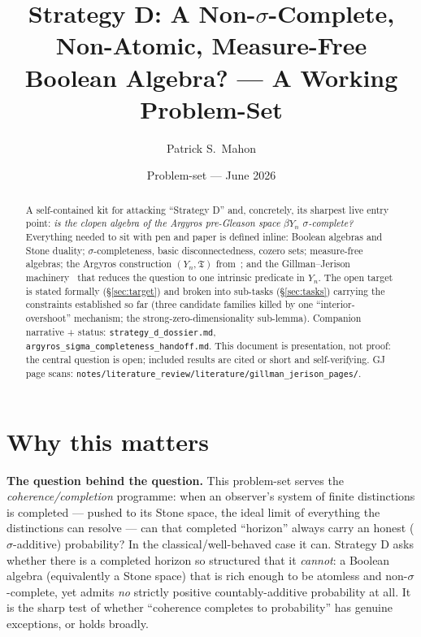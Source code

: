 \documentclass[11pt]{article}
\title{Strategy D: A Non-$\sigma$-Complete, Non-Atomic, Measure-Free\\
Boolean Algebra? --- A Working Problem-Set}
\author{Patrick S.\ Mahon}
\date{Problem-set --- June 2026}
\theoremstyle{definition}
\theoremstyle{remark}
\newcommand{\Y}{Y_n}
\newcommand{\T}{\mathfrak{T}}
\begin{document}
\maketitle

\begin{abstract}
\noindent A self-contained kit for attacking ``Strategy D'' and, concretely, its
sharpest live entry point: \emph{is the clopen algebra of the Argyros pre-Gleason
space $\beta\Y$ $\sigma$-complete?} Everything needed to sit with pen and paper is
defined inline: Boolean algebras and Stone duality; $\sigma$-completeness, basic
disconnectedness, cozero sets; measure-free algebras; the Argyros construction
$(\Y,\T)$ from~\cite{Argyros1983}; and the Gillman--Jerison
machinery~\cite{GJ} that reduces the question to one intrinsic predicate in $\Y$.
The open target is stated formally (\S\ref{sec:target}) and broken into sub-tasks
(\S\ref{sec:tasks}) carrying the constraints established so far (three candidate
families killed by one ``interior-overshoot'' mechanism; the strong-zero-dimensionality
sub-lemma). Companion narrative + status: \texttt{strategy\_d\_dossier.md},
\texttt{argyros\_sigma\_completeness\_handoff.md}. This document is presentation, not
proof: the central question is open; included results are cited or short and
self-verifying. GJ page scans:
\texttt{notes/literature\_review/literature/gillman\_jerison\_pages/}.
\end{abstract}

\tableofcontents

\section*{Why this matters}

\noindent\textbf{The question behind the question.} This problem-set serves the
\emph{coherence/completion} programme: when an observer's system of finite
distinctions is completed --- pushed to its Stone space, the ideal limit of
everything the distinctions can resolve --- can that completed ``horizon'' always
carry an honest ($\sigma$-additive) probability? In the classical/well-behaved
case it can. Strategy D asks whether there is a completed horizon so structured
that it \emph{cannot}: a Boolean algebra (equivalently a Stone space) that is rich
enough to be atomless and non-$\sigma$-complete, yet admits \emph{no} strictly
positive countably-additive probability at all. It is the sharp test of whether
``coherence completes to probability'' has genuine exceptions, or holds broadly.
\end{document}
